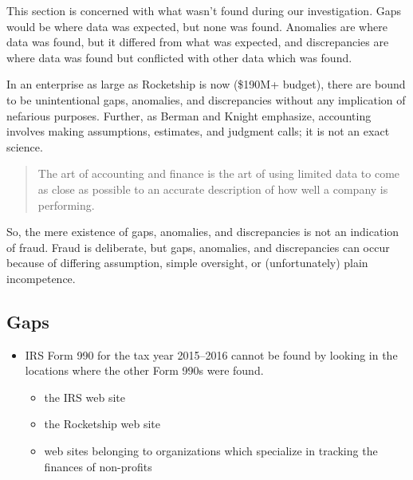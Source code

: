 This section is concerned with what wasn't found during our investigation. Gaps would be where data was expected, but none was found. Anomalies are where data was found, but it differed from what was expected, and discrepancies are where data was found but conflicted with other data which was found.

In an enterprise as large as Rocketship is now (\$190M+ budget), there are bound to be unintentional gaps, anomalies, and discrepancies without any implication of nefarious purposes. Further, as Berman and Knight emphasize, accounting involves making assumptions, estimates, and judgment calls; it is not an exact science.
\begin{quotation}
  The art of accounting and finance is the art of using limited data to come as close as possible to an accurate description of how well a company is performing.
\end{quotation}

So, the mere existence of gaps, anomalies, and discrepancies is not an indication of fraud. Fraud is deliberate, but gaps, anomalies, and discrepancies can occur because of differing assumption, simple oversight, or (unfortunately) plain incompetence.

\subsection{Gaps}\indent%
\label{sec:gaps}
\begin{itemize}
  \item IRS Form 990 for the tax year 2015–2016 cannot be found by looking in the locations where the other Form 990s were found.
  \begin{itemize}
    \item the IRS web site
    \item the Rocketship web site
    \item web sites belonging to organizations which specialize in tracking the finances of non-profits
  \end{itemize}
\end{itemize}

